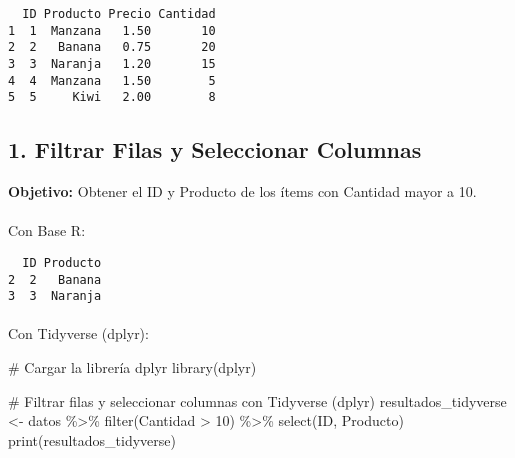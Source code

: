 \documentclass[
  letterpaper,
  DIV=11,
  numbers=noendperiod]{scrartcl}
\makeatletter
\let\oldparagraph\paragraph
\renewcommand{\paragraph}{
    \@ifstar
      \xxxParagraphStar
      \xxxParagraphNoStar
  }
\newcommand{\xxxParagraphStar}[1]{\oldparagraph*{#1}\mbox{}}
\newcommand{\xxxParagraphNoStar}[1]{\oldparagraph{#1}\mbox{}}
\newenvironment{Shaded}{\begin{snugshade}}{\end{snugshade}}
\newcommand{\CommentTok}[1]{\textcolor[rgb]{0.37,0.37,0.37}{#1}}
\newcommand{\DecValTok}[1]{\textcolor[rgb]{0.68,0.00,0.00}{#1}}
\newcommand{\FunctionTok}[1]{\textcolor[rgb]{0.28,0.35,0.67}{#1}}
\newcommand{\NormalTok}[1]{\textcolor[rgb]{0.00,0.23,0.31}{#1}}
\newcommand{\OtherTok}[1]{\textcolor[rgb]{0.00,0.23,0.31}{#1}}
\newcommand{\SpecialCharTok}[1]{\textcolor[rgb]{0.37,0.37,0.37}{#1}}
\newcommand{\StringTok}[1]{\textcolor[rgb]{0.13,0.47,0.30}{#1}}
\makeatother
\begin{document}
\begin{verbatim}
  ID Producto Precio Cantidad
1  1  Manzana   1.50       10
2  2   Banana   0.75       20
3  3  Naranja   1.20       15
4  4  Manzana   1.50        5
5  5     Kiwi   2.00        8
\end{verbatim}

\subsection{1. Filtrar Filas y Seleccionar
Columnas}\label{filtrar-filas-y-seleccionar-columnas}

\textbf{Objetivo:} Obtener el ID y Producto de los ítems con Cantidad
mayor a 10.

\paragraph{Con Base R:}\label{con-base-r}

\begin{Shaded}
\end{Shaded}

\begin{verbatim}
  ID Producto
2  2   Banana
3  3  Naranja
\end{verbatim}

\paragraph{Con Tidyverse (dplyr):}\label{con-tidyverse-dplyr}

\begin{Shaded}
\begin{Highlighting}[]
\CommentTok{\# Cargar la librería dplyr}
\FunctionTok{library}\NormalTok{(dplyr)}

\CommentTok{\# Filtrar filas y seleccionar columnas con Tidyverse (dplyr)}
\NormalTok{resultados\_tidyverse }\OtherTok{\textless{}{-}}\NormalTok{ datos }\SpecialCharTok{\%\textgreater{}\%}
  \FunctionTok{filter}\NormalTok{(Cantidad }\SpecialCharTok{\textgreater{}} \DecValTok{10}\NormalTok{) }\SpecialCharTok{\%\textgreater{}\%}
  \FunctionTok{select}\NormalTok{(ID, Producto)}
\FunctionTok{print}\NormalTok{(resultados\_tidyverse)}
\end{Highlighting}
\end{Shaded}
\end{document}
